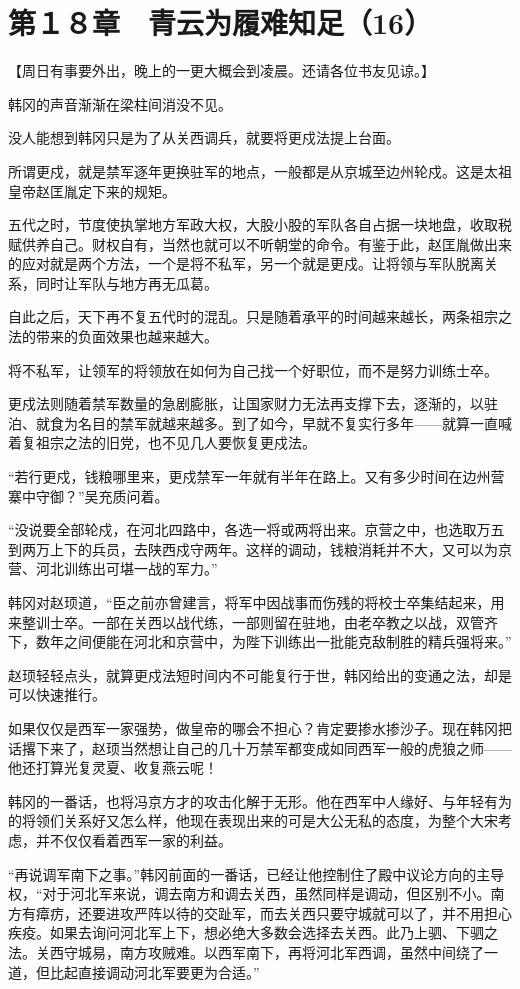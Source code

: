 \section{第１８章　青云为履难知足（16）}

【周日有事要外出，晚上的一更大概会到凌晨。还请各位书友见谅。】

韩冈的声音渐渐在梁柱间消没不见。

没人能想到韩冈只是为了从关西调兵，就要将更戍法提上台面。

所谓更戍，就是禁军逐年更换驻军的地点，一般都是从京城至边州轮戍。这是太祖皇帝赵匡胤定下来的规矩。

五代之时，节度使执掌地方军政大权，大股小股的军队各自占据一块地盘，收取税赋供养自己。财权自有，当然也就可以不听朝堂的命令。有鉴于此，赵匡胤做出来的应对就是两个方法，一个是将不私军，另一个就是更戍。让将领与军队脱离关系，同时让军队与地方再无瓜葛。

自此之后，天下再不复五代时的混乱。只是随着承平的时间越来越长，两条祖宗之法的带来的负面效果也越来越大。

将不私军，让领军的将领放在如何为自己找一个好职位，而不是努力训练士卒。

更戍法则随着禁军数量的急剧膨胀，让国家财力无法再支撑下去，逐渐的，以驻泊、就食为名目的禁军就越来越多。到了如今，早就不复实行多年——就算一直喊着复祖宗之法的旧党，也不见几人要恢复更戍法。

“若行更戍，钱粮哪里来，更戍禁军一年就有半年在路上。又有多少时间在边州营寨中守御？”吴充质问着。

“没说要全部轮戍，在河北四路中，各选一将或两将出来。京营之中，也选取万五到两万上下的兵员，去陕西戍守两年。这样的调动，钱粮消耗并不大，又可以为京营、河北训练出可堪一战的军力。”

韩冈对赵顼道，“臣之前亦曾建言，将军中因战事而伤残的将校士卒集结起来，用来整训士卒。一部在关西以战代练，一部则留在驻地，由老卒教之以战，双管齐下，数年之间便能在河北和京营中，为陛下训练出一批能克敌制胜的精兵强将来。”

赵顼轻轻点头，就算更戍法短时间内不可能复行于世，韩冈给出的变通之法，却是可以快速推行。

如果仅仅是西军一家强势，做皇帝的哪会不担心？肯定要掺水掺沙子。现在韩冈把话撂下来了，赵顼当然想让自己的几十万禁军都变成如同西军一般的虎狼之师——他还打算光复灵夏、收复燕云呢！

韩冈的一番话，也将冯京方才的攻击化解于无形。他在西军中人缘好、与年轻有为的将领们关系好又怎么样，他现在表现出来的可是大公无私的态度，为整个大宋考虑，并不仅仅看着西军一家的利益。

“再说调军南下之事。”韩冈前面的一番话，已经让他控制住了殿中议论方向的主导权，“对于河北军来说，调去南方和调去关西，虽然同样是调动，但区别不小。南方有瘴疠，还要进攻严阵以待的交趾军，而去关西只要守城就可以了，并不用担心疾疫。如果去询问河北军上下，想必绝大多数会选择去关西。此乃上驷、下驷之法。关西守城易，南方攻贼难。以西军南下，再将河北军西调，虽然中间绕了一道，但比起直接调动河北军要更为合适。”

